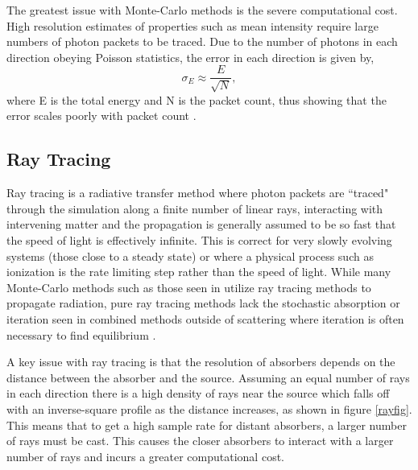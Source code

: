 The greatest issue with Monte-Carlo methods is the severe computational cost. High resolution estimates of properties such as mean intensity require large numbers of photon packets to be traced. Due to the number of photons in each direction obeying Poisson statistics, the error in each direction is given by,
\begin{equation}
    \sigma_E \approx \frac{E}{\sqrt{N}},
\end{equation}
where E is the total energy and N is the packet count, thus showing that the error scales poorly with packet count \citep{MC5}.

\subsection{Ray Tracing}

Ray tracing is a radiative transfer method where photon packets are ``traced" through the simulation along a finite number of linear rays, interacting with intervening matter and the propagation is generally assumed to be so fast that the speed of light is effectively infinite. This is correct for very slowly evolving systems (those close to a steady state) or where a physical process such as ionization is the rate limiting step rather than the speed of light. While many Monte-Carlo methods such as those seen in \citep{MCRT} utilize ray tracing methods to propagate radiation, pure ray tracing methods lack the stochastic absorption or iteration seen in combined methods outside of scattering where iteration is often necessary to find equilibrium \citep{DART}.

A key issue with ray tracing is that the resolution of absorbers depends on the distance between the absorber and the source. Assuming an equal number of rays in each direction there is a high density of rays near the source which falls off with an inverse-square profile as the distance increases, as shown in figure \ref{rayfig}. This means that to get a high sample rate for distant absorbers, a larger number of rays must be cast. This causes the closer absorbers to interact with a larger number of rays and incurs a greater computational cost.


